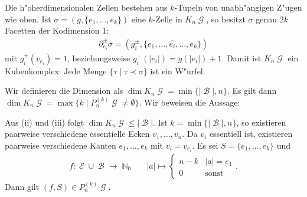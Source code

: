 \documentclass[paper=A4, twoside, chapterprefix=true, bibliography=totoc, headsepline]{scrbook}
\DeclareMathOperator{\N}{\mathbb{N}}
\DeclareMathOperator{\calB}{{\mathcal{B}}}
\DeclareMathOperator{\calE}{{\mathcal{E}}}
\DeclareMathOperator{\calG}{{\mathcal{G}}}
\newcommand{\E}{\calE}
\newcommand{\G}{\calG}
\theoremstyle{break}
\theoremstyle{nonumberbreak}
\theoremstyle{emptybreak}
\theoremstyle{break}
\begin{document}
Die h"oherdimensionalen Zellen bestehen aus $k$-Tupeln von unabh"angigen Z"ugen wie oben.
Ist $\sigma = (g, \{e_1, \ldots, e_k\})$ eine $k$-Zelle in $K_n\G$, so besitzt $\sigma$ genau $2k$ Facetten der Kodimension 1:
\begin{align*}
	\partial_{e_i}^\pm \sigma = ( g_i^\pm, \{e_1, \ldots, \hat{e_i}, \ldots, e_k \})
\end{align*}
mit $g_i^+(v_{e_i}) = 1$, beziehungsweise $g_i^-(|e_i|) = g(|e_i|) + 1$.
Damit ist $K_n\G$ ein Kubenkomplex: Jede Menge $\{ \tau \mid \tau \prec \sigma \}$ ist ein W"urfel.


Wir definieren die Dimension als $\dim K_n\G = \min \{ |\calB|, n\}$.
Es gilt dann $\dim K_n\G = \max \{k \mid P_n^{(k)}\G \ne \emptyset\}$.
Wir beweisen die Aussage:

Aus (ii) und (iii) folgt $\dim K_n\G \le |\calB|$.
Ist $k = \min \{|\calB|, n \}$, so existieren paarweise verschiedene essentielle Ecken $v_1, \ldots, v_n$.
Da $v_i$ essentiell ist, existieren paarweise verschiedene Kanten $e_1, \ldots, e_k$ mit $v_i = v_{e_i}$.
Es sei $S = \{e_1, \ldots, e_k\}$ und
\begin{align*}
	f: \E \cup \calB \to \N_0 && |a| \mapsto \begin{cases} n-k & |a| = e_1 \\ 0 & \text{sonst} \end{cases}.
\end{align*}
Dann gilt $(f, S) \in P_n^{(k)}\G$.
\end{document}
